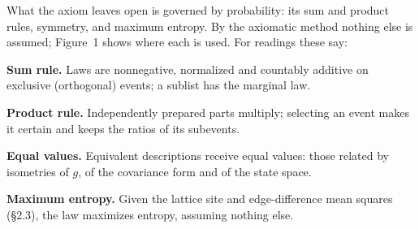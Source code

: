 \documentclass[10pt,a4paper]{article}
\begin{document}
What the axiom leaves open is governed by probability: its sum and product rules, symmetry, and maximum entropy. By the axiomatic method nothing else is assumed; Figure~1 shows where each is used. For readings these say:

\begin{list}{}{%
  \setlength{\leftmargin}{1.35em}%
  \setlength{\itemsep}{0.16em}%
  \setlength{\parsep}{0pt}%
  \setlength{\topsep}{0.32em}%
}
\item \textbf{Sum rule.} Laws are nonnegative, normalized and countably additive on exclusive (orthogonal) events; a sublist has the marginal law.
\item \textbf{Product rule.} Independently prepared parts multiply; selecting an event makes it certain and keeps the ratios of its subevents.
\item \textbf{Equal values.} Equivalent descriptions receive equal values: those related by isometries of $g$, of the covariance form and of the state space.
\item \textbf{Maximum entropy.} Given the lattice site and edge-difference mean squares (\S2.3), the law maximizes entropy, assuming nothing else.
\end{list}

\vspace{0.2em}
\noindent{}
\end{document}
